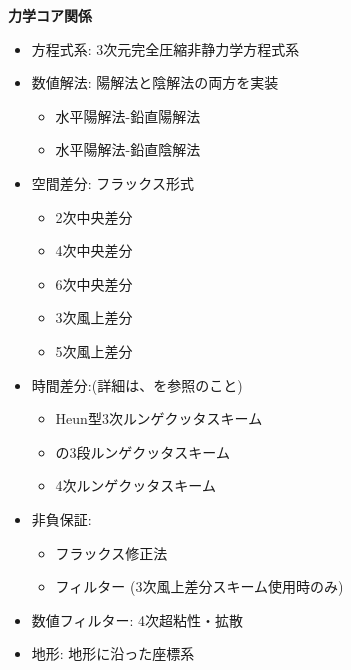 {\bf 力学コア関係}
\begin{itemize}
 \item 方程式系: 3次元完全圧縮非静力学方程式系
 \item 数値解法: 陽解法と陰解法の両方を実装
   \begin{itemize}
    \item 水平陽解法-鉛直陽解法
    \item 水平陽解法-鉛直陰解法
   \end{itemize}
 \item 空間差分: フラックス形式
    \begin{itemize}
      \item 2次中央差分
      \item 4次中央差分
      \item 6次中央差分
      \item 3次風上差分
      \item 5次風上差分
    \end{itemize}
 \item 時間差分:(詳細は、\citet{scale_2015}を参照のこと)
    \begin{itemize}
      \item Heun型3次ルンゲクッタスキーム
      \item \citet{Wicker_2002}の3段ルンゲクッタスキーム
      \item 4次ルンゲクッタスキーム
    \end{itemize}
 \item 非負保証:
    \begin{itemize}
      \item フラックス修正法 \citep[Flux Corrected Transport, FCT; ][]{zalesak_1979}
      \item \citet{Koren_1993}フィルター  (3次風上差分スキーム使用時のみ)
    \end{itemize}
 \item 数値フィルター: 4次超粘性・拡散
 \item 地形: 地形に沿った座標系
\end{itemize}

